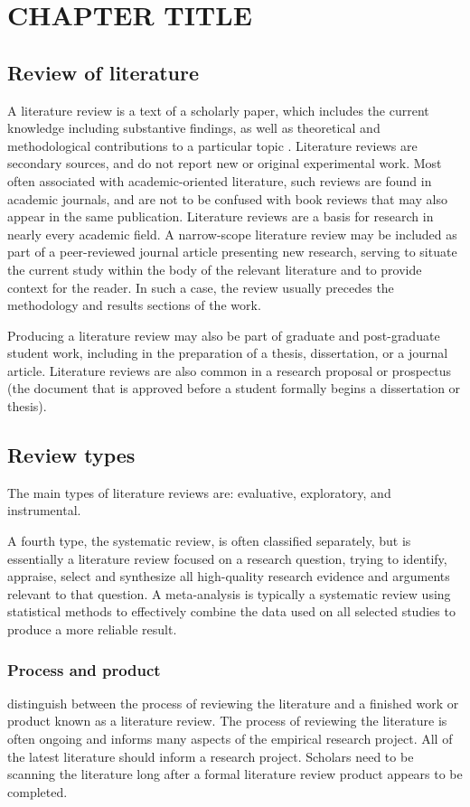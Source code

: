 \chapter{CHAPTER TITLE} \label{c2}
\section {Review of literature}
A literature review is a text of a scholarly paper, which includes the current knowledge including substantive findings, as well as theoretical and methodological contributions to a particular topic \cite{slavin2014medical}. Literature reviews are secondary sources, and do not report new or original experimental work. Most often associated with academic-oriented literature, such reviews are found in academic journals, and are not to be confused with book reviews that may also appear in the same publication. Literature reviews are a basis for research in nearly every academic field. A narrow-scope literature review may be included as part of a peer-reviewed journal article presenting new research, serving to situate the current study within the body of the relevant literature and to provide context for the reader. In such a case, the review usually precedes the methodology and results sections of the work.

Producing a literature review may also be part of graduate and post-graduate student work, including in the preparation of a thesis, dissertation, or a journal article. Literature reviews are also common in a research proposal or prospectus (the document that is approved before a student formally begins a dissertation or thesis).

\section {Review types}
The main types of literature reviews are: evaluative, exploratory, and instrumental.

A fourth type, the systematic review, is often classified separately, but is essentially a literature review focused on a research question, trying to identify, appraise, select and synthesize all high-quality research evidence and arguments relevant to that question. A meta-analysis is typically a systematic review using statistical methods to effectively combine the data used on all selected studies to produce a more reliable result.


\subsection {Process and product}
 distinguish between the process of reviewing the literature and a finished work or product known as a literature review. The process of reviewing the literature is often ongoing and informs many aspects of the empirical research project. All of the latest literature should inform a research project. Scholars need to be scanning the literature long after a formal literature review product appears to be completed.

